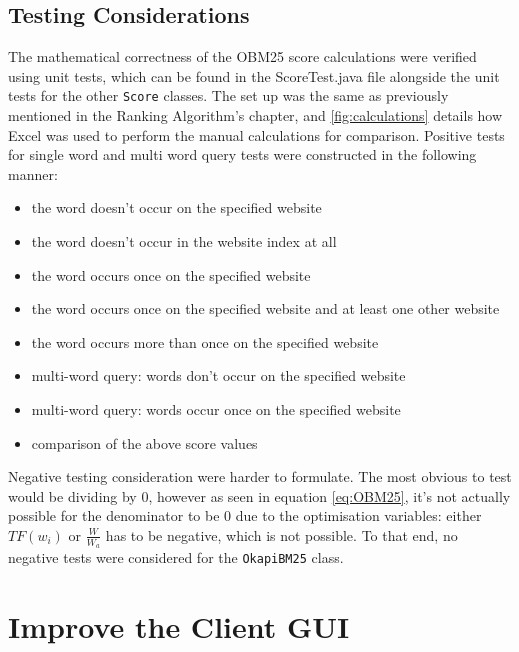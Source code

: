 \subsection{Testing Considerations}
The mathematical correctness of the OBM25 score calculations were verified using unit tests, which can be found in the ScoreTest.java file alongside the unit tests for the other {\tt Score} classes.
The set up was the same as previously mentioned in the Ranking Algorithm's chapter, and \ref{fig:calculations} details how Excel was used to perform the manual calculations for comparison.
Positive tests for single word and multi word query tests were constructed in the following manner:
\begin{itemize}
    \item the word doesn't occur on the specified website
    \item the word doesn't occur in the website index at all
    \item the word occurs once on the specified website
    \item the word occurs once on the specified website and at least one other website
    \item the word occurs more than once on the specified website
    \item multi-word query: words don't occur on the specified website
    \item multi-word query: words occur once on the specified website
    \item comparison of the above score values
\end{itemize}

Negative testing consideration were harder to formulate.
The most obvious to test would be dividing by 0, however as seen in equation \ref{eq:OBM25}, it's not actually possible for the denominator to be 0 due to the optimisation variables: either $TF(w_i)$ or $\frac{W}{W_a}$ has to be negative, which is not possible.
To that end, no negative tests were considered for the {\tt OkapiBM25} class.

\section{Improve the Client GUI} %

